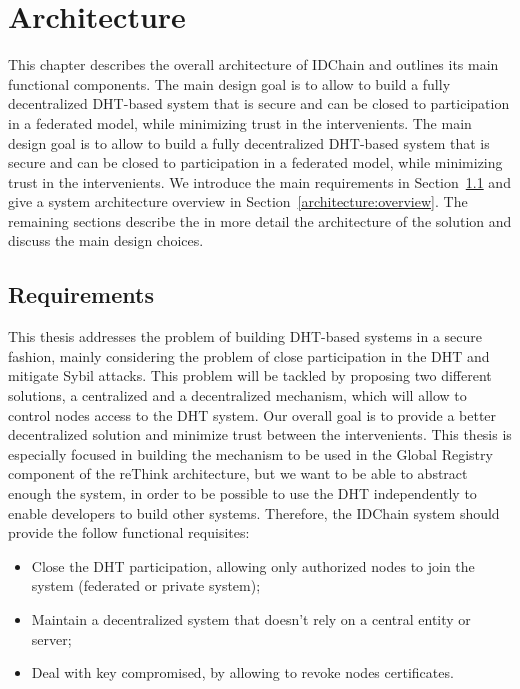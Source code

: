 \chapter{Architecture}
\label{chapter:architecture}

This chapter describes the overall architecture of IDChain and outlines its main functional components.
The main design goal is to allow to build a fully decentralized DHT-based system that is secure and can be closed to participation in a federated model, while minimizing trust in the intervenients.
The main design goal is to allow to build a fully decentralized DHT-based system that is secure and can be closed to participation in a federated model, while minimizing trust in the intervenients.
We introduce the main requirements in Section~\ref{architecture:requirements} and give a system architecture overview in Section~\ref{architecture:overview}.
The remaining sections describe the in more detail the architecture of the solution and discuss the main design choices.

\section{Requirements}\label{architecture:requirements}

This thesis addresses the problem of building DHT-based systems in a secure fashion, mainly considering the problem of close participation in the DHT and mitigate Sybil attacks.
This problem will be tackled by proposing two different solutions, a centralized and a decentralized mechanism, which will allow to control nodes access to the DHT system.
Our overall goal is to provide a better decentralized solution and minimize trust between the intervenients.
This thesis is especially focused in building the mechanism to be used in the Global Registry component of the reThink architecture, but we want to be able to abstract enough the system, in order to be possible to use the DHT independently to enable developers to build other systems.
Therefore, the IDChain system should provide the follow functional requisites:

\begin{itemize}
  \item Close the DHT participation, allowing only authorized nodes to join the system (federated or private system);
  \item Maintain a decentralized system that doesn't rely on a central entity or server;
  \item Deal with key compromised, by allowing to revoke nodes certificates.
\end{itemize}

